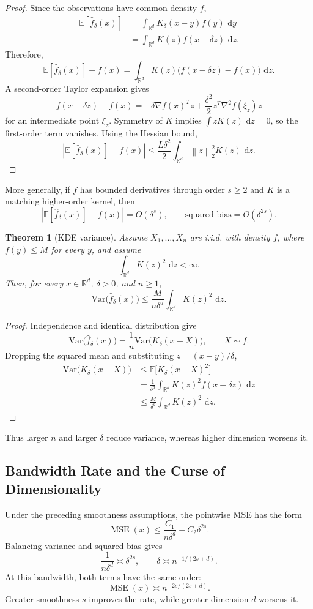 \documentclass[12pt,oneside]{book}
\numberwithin{equation}{section}
\theoremstyle{definition}
\theoremstyle{plain}
\newtheorem{theorem}{Theorem}[section]
\theoremstyle{remark}
\newcommand{\R}{\mathbb{R}}
\newcommand{\E}{\mathbb{E}}
\newcommand{\Var}{\mathrm{Var}}
\newcommand{\norm}[1]{\left\lVert #1 \right\rVert}
\newcommand{\dd}{\,\mathrm{d}}
\begin{document}
\begin{proof}
Since the observations have common density $f$,
\begin{align*}
\E[\widehat f_\delta(x)]
&=\int_{\R^d}K_\delta(x-y)f(y)\,\dd y\\
&=\int_{\R^d}K(z)f(x-\delta z)\,\dd z.
\end{align*}
Therefore,
\[
\E[\widehat f_\delta(x)]-f(x)
=\int_{\R^d}K(z)\bigl(f(x-\delta z)-f(x)\bigr)\,\dd z.
\]
A second-order Taylor expansion gives
\[
f(x-\delta z)-f(x)
=-\delta\nabla f(x)^Tz
+\frac{\delta^2}{2}z^T\nabla^2f(\xi_z)z
\]
for an intermediate point $\xi_z$. Symmetry of $K$ implies $\int zK(z)\,\dd z=0$, so the first-order term vanishes. Using the Hessian bound,
\[
\left\lvert\E[\widehat f_\delta(x)]-f(x)\right\rvert
\leq\frac{L\delta^2}{2}
\int_{\R^d}\norm{z}_2^2K(z)\,\dd z.
\]
\end{proof}

More generally, if $f$ has bounded derivatives through order $s\geq2$ and $K$ is a matching higher-order kernel, then
\[
\left\lvert\E[\widehat f_\delta(x)]-f(x)\right\rvert
=O(\delta^s),
\qquad
\text{squared bias}=O(\delta^{2s}).
\]

\begin{theorem}[KDE variance]
Assume $X_1,\ldots,X_n$ are i.i.d. with density $f$, where $f(y)\leq M$ for every $y$, and assume
\[
\int_{\R^d}K(z)^2\,\dd z<\infty.
\]
Then, for every $x\in\R^d$, $\delta>0$, and $n\geq1$,
\[
\Var\bigl(\widehat f_\delta(x)\bigr)
\leq\frac{M}{n\delta^d}
\int_{\R^d}K(z)^2\,\dd z.
\]
\end{theorem}

\begin{proof}
Independence and identical distribution give
\[
\Var\bigl(\widehat f_\delta(x)\bigr)
=\frac{1}{n}\Var\bigl(K_\delta(x-X)\bigr),
\qquad X\sim f.
\]
Dropping the squared mean and substituting $z=(x-y)/\delta$,
\begin{align*}
\Var\bigl(K_\delta(x-X)\bigr)
&\leq\E\bigl[K_\delta(x-X)^2\bigr]\\
&=\frac{1}{\delta^d}
\int_{\R^d}K(z)^2f(x-\delta z)\,\dd z\\
&\leq\frac{M}{\delta^d}
\int_{\R^d}K(z)^2\,\dd z.
\end{align*}
\end{proof}

Thus larger $n$ and larger $\delta$ reduce variance, whereas higher dimension worsens it.

\subsection{Bandwidth Rate and the Curse of Dimensionality}
Under the preceding smoothness assumptions, the pointwise MSE has the form
\[
\operatorname{MSE}(x)
\leq\frac{C_1}{n\delta^d}+C_2\delta^{2s}.
\]
Balancing variance and squared bias gives
\[
\frac{1}{n\delta^d}\asymp\delta^{2s},
\qquad
\delta\asymp n^{-1/(2s+d)}.
\]
At this bandwidth, both terms have the same order:
\[
\operatorname{MSE}(x)\asymp n^{-2s/(2s+d)}.
\]
Greater smoothness $s$ improves the rate, while greater dimension $d$ worsens it.
\end{document}
